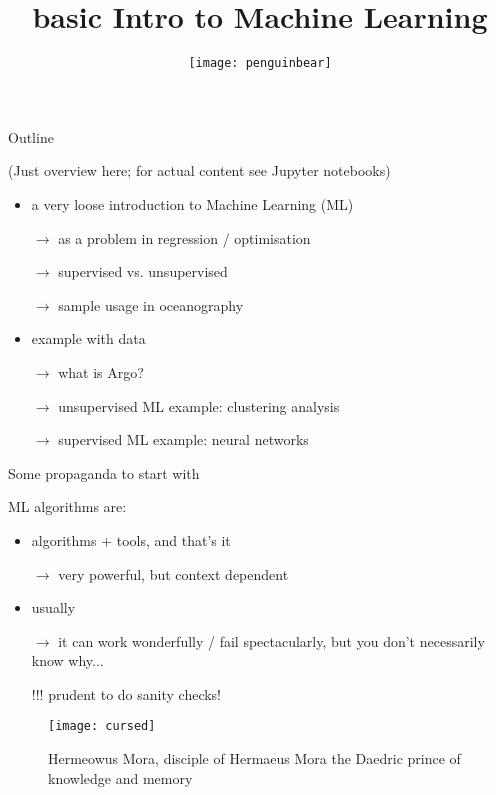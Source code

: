 \documentclass[xcolor=x11names,compress]{beamer}
\title{{\tiny basic} Intro to Machine Learning}
\author%
{}
\subtitle{\vspace*{5mm} \texttt{[image: penguinbear]}}
\date{}
\renewcommand{\(}{\begin{columns}}
\renewcommand{\)}{\end{columns}}
\newcommand{\<}[1]{\begin{column}{#1}}
\renewcommand{\>}{\end{column}}
\begin{document}
\maketitle


\begin{frame}{Outline}

{\scriptsize (Just overview here; for actual content see Jupyter notebooks)}

\begin{itemize}
  \item a very loose introduction to Machine Learning (ML)
  \item[] $\to$ as a problem in regression / optimisation
  \item[] $\to$ supervised vs. unsupervised
  \item[] $\to$ sample usage in oceanography
  \item[]
  \item example with  data
  \item[] $\to$ what is Argo?
  \item[] $\to$ unsupervised ML example: clustering analysis
  \item[] $\to$ supervised ML example: neural networks
\end{itemize}

\end{frame}


\begin{frame}{Some propaganda to start with}

\parbox{0.5\textwidth}{ML algorithms are:
\begin{itemize}
  \item algorithms + tools, and that's it
  \item[] $\to$ very powerful, but context dependent
  \item usually 
  \item[] $\to$ it can work wonderfully / fail spectacularly, but you don't
  necessarily know why...
  \item[]
  \item[!!!] prudent to do sanity checks!
\end{itemize}}\hspace*{1mm}\parbox{0.45\textwidth}{\begin{figure}
  \texttt{[image: cursed]}
  \caption{Hermeowus Mora, disciple of Hermaeus Mora the Daedric prince of
  knowledge and memory}
\end{figure}}

\end{frame}
\end{document}
